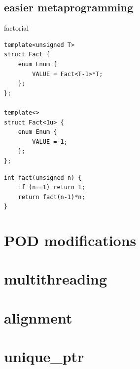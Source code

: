 \documentclass{beamer}
\begin{document}
\subsection{easier metaprogramming}
\begin{frame}{factorial}
  \begin{block}{}
\begin{verbatim}
template<unsigned T>
struct Fact {
    enum Enum {
        VALUE = Fact<T-1>*T;
    };
};

template<>
struct Fact<1u> {
    enum Enum {
        VALUE = 1;
    };
};

\end{verbatim}
  \end{block}

  \begin{block}{}
\begin{verbatim}
int fact(unsigned n) {
    if (n==1) return 1;
    return fact(n-1)*n;
}

\end{verbatim}
  \end{block}
\end{frame}

\section{POD modifications}
\section{multithreading}
\section{alignment}
\section{unique\_ptr}
\end{document}
